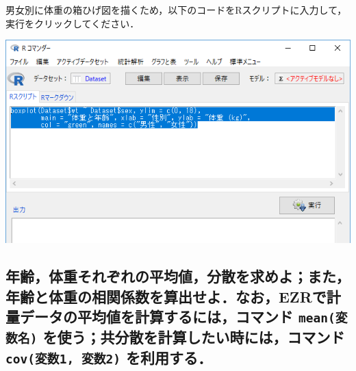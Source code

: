 \documentclass[11pt,]{problemset}
\newenvironment{Shaded}{\begin{snugshade}}{\end{snugshade}}
\newcommand{\DataTypeTok}[1]{\textcolor[rgb]{0.13,0.29,0.53}{#1}}
\newcommand{\DecValTok}[1]{\textcolor[rgb]{0.00,0.00,0.81}{#1}}
\newcommand{\KeywordTok}[1]{\textcolor[rgb]{0.13,0.29,0.53}{\textbf{#1}}}
\newcommand{\NormalTok}[1]{#1}
\newcommand{\OperatorTok}[1]{\textcolor[rgb]{0.81,0.36,0.00}{\textbf{#1}}}
\newcommand{\StringTok}[1]{\textcolor[rgb]{0.31,0.60,0.02}{#1}}
\begin{document}
\newpage
\vfill

男女別に体重の箱ひげ図を描くため，以下のコードをRスクリプトに入力して，実行をクリックしてください．

\begin{Shaded}
\end{Shaded}

\begin{center}\includegraphics[width=0.8\linewidth]{pic/box01} \end{center}

\hypertarget{ezr-mean--cov1-2-}{%
\subsection{\texorpdfstring{年齢，体重それぞれの平均値，分散を求めよ；また，年齢と体重の相関係数を算出せよ．なお，EZRで計量データの平均値を計算するには，コマンド
\texttt{mean(変数名)} を使う；共分散を計算したい時には，コマンド
\texttt{cov(変数1,\ 変数2)}
を利用する．}{年齢，体重それぞれの平均値，分散を求めよ；また，年齢と体重の相関係数を算出せよ．なお，EZRで計量データの平均値を計算するには，コマンド mean(変数名) を使う；共分散を計算したい時には，コマンド cov(変数1, 変数2) を利用する．}}\label{ezr-mean--cov1-2-}}
\end{document}
